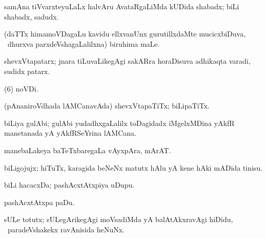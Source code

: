 {{{{{{\bentry
{}
 \gl{\nA}\bmng
samAna tiVvarxteyuLaLx halvAru AvataRgaLiMda kUDida shabadx; biLi shabadx, sadudx. 
\emng
\eentry

\bentry
{}
  \gl{\nA}\bmng
(daTTx himamoVDagaLu kavidu ellxvanUnx gurutillxdaMte mucicxbiDuva, \kanmu\ dhurxva parxdeVshagaLalilxna) biruhima maLe. 
\emng
\eentry

\bentry
{}
  \gl{\nA}\bmng
{} 
\emng
\eentry

\bentry
{}
 \gl{\nA}\bmng
shevxVtapatarx; jnara tiLuvaLikegAgi sakARra horaDisuva adhikaqta varadi, sudidx patarx. 
\emng
\eentry

\bentry
{}
 \gl{\nA}\bmng
{} (\pagu $6$) noVDi. 
\emng
\eentry

\bentry
{}
 \gl{\nA}\bmng
{} 
\emng
\eentry

\bentry
{}
 \gl{\nA}\bmng
(pAnaniroVdhada lAMCanavAda) shevxVtapaTiTx; biLipaTiTx. 
\emng
\eentry

\bentry
{}
 \gl{\nA}\bmng
biLiya gulAbi; gulAbi yudadhxgaLalilx toDagidadx iMgelxMDina yAkfR manetanada yA yAkfRSeYrina lAMCana. 
\emng
\eentry

\bentry
{}
 \gl{\nA}\bmng
{} 
\emng
\eentry

\bentry
{}
 \gl{\nA}\bmng
manebaLakeya baTeTxbaregaLa vAyxpAra, mArAT. 
\emng
\eentry

\bentry
{}
 \gl{\nA}\bmng
biLigojujx; hiTuTx, karagida beNeNx matutx hAlu yA kene hAki mADida tinisu. 
\emng
\eentry

\bentry
{}
\gl{\nA}
\bmng
biLi hacacxDa; pashAcxtAtxpiya uDupu. 
\emng

\noindent
\gl{\pagu}
\bmng
{} pashAcxtAtxpa paDu. 
\emng
\eentry

\bentry
{}
 \gl{\nA}\bmng
sULe totutx; sULegArikegAgi moVsadiMda yA balAtAkxravAgi hiDidu, \sA\ paradeVshakekx ravAnisida heNuNx. 
\emng
\eentry

}}}}}}
